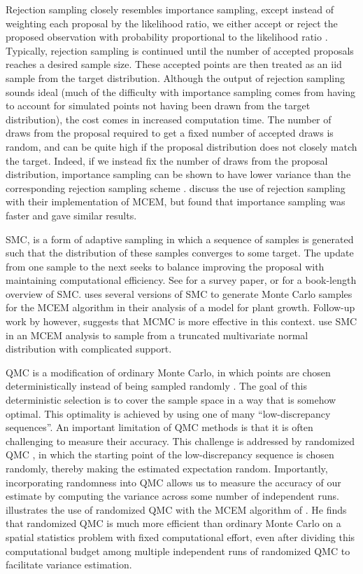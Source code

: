 \documentclass[ss]{imsart}
\theoremstyle{plain}
\theoremstyle{definition}
\theoremstyle{remark}
\begin{document}
Rejection sampling closely resembles importance sampling, except instead of weighting each proposal by the likelihood ratio, we either accept or reject the proposed observation with probability proportional to the likelihood ratio \citep{Rob04}. Typically, rejection sampling is continued until the number of accepted proposals reaches a desired sample size. These accepted points are then treated as an iid sample from the target distribution. Although the output of rejection sampling sounds ideal (much of the difficulty with importance sampling comes from having to account for simulated points not having been drawn from the target distribution), the cost comes in increased computation time. The number of draws from the proposal required to get a fixed number of accepted draws is random, and can be quite high if the proposal distribution does not closely match the target. Indeed, if we instead fix the number of draws from the proposal distribution, importance sampling can be shown to have lower variance than the corresponding rejection sampling scheme \citep[see Section 8.8 of][]{Cho20}. \citet{Boo99} discuss the use of rejection sampling with their implementation of MCEM, but found that importance sampling was faster and gave similar results.

SMC, is a form of adaptive sampling in which a sequence of samples is generated such that the distribution of these samples converges to some target. The update from one sample to the next seeks to balance improving the proposal with maintaining computational efficiency. See \citet{Del06} for a survey paper, or \citet{Cho20} for a book-length overview of SMC. \citet{Tre13} uses several versions of SMC to generate Monte Carlo samples for the MCEM algorithm in their analysis of a model for plant growth. Follow-up work by \citet{Tre14} however, suggests that MCMC is more effective in this context. \citet{Mof14} use SMC in an MCEM analysis to sample from a truncated multivariate normal distribution with complicated support.

QMC is a modification of ordinary Monte Carlo, in which points are chosen deterministically instead of being sampled randomly \citep{Caf98}. The goal of this deterministic selection is to cover the sample space in a way that is somehow optimal. This optimality is achieved by using one of many ``low-discrepancy sequences''. An important limitation of QMC methods is that it is often challenging to measure their accuracy. This challenge is addressed by randomized QMC \citep{LEc02}, in which the starting point of the low-discrepancy sequence is chosen randomly, thereby making the estimated expectation random. Importantly, incorporating randomness into QMC allows us to measure the accuracy of our estimate by computing the variance across some number of independent runs. \citet{Jan05} illustrates the use of randomized QMC with the MCEM algorithm of \citet{Boo99}. He finds that randomized QMC is much more efficient than ordinary Monte Carlo on a spatial statistics problem with fixed computational effort, even after dividing this computational budget among multiple independent runs of randomized QMC to facilitate variance estimation.
\end{document}
